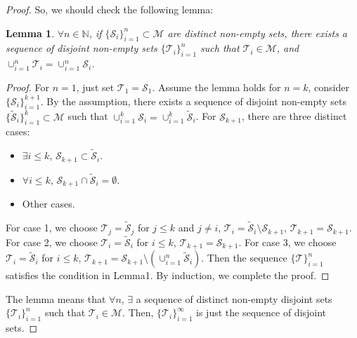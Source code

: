 \documentclass{article}
\newtheorem{lemma}{Lemma}
\begin{document}
\begin{proof}
    So, we should check the following lemma:
    \begin{lemma}
        $\forall n\in\mathbb{N}$, 
        if $\{\mathcal{S}_{i}\}_{i=1}^{n}\subset\mathcal{M}$ 
        are distinct non-empty sets,
        there exists a sequence of disjoint non-empty sets 
        $\{\mathcal{T}_{i}\}_{i=1}^{n}$ 
        such that $\mathcal{T}_{i}\in\mathcal{M}$, and 
        $\cup_{i=1}^{n}\mathcal{T}_{i}=\cup_{i=1}^{n}\mathcal{S}_{i}$.
    \end{lemma}
    \begin{proof}
        For $n=1$, 
        just set $\mathcal{T}_{1}=\mathcal{S}_{1}$.
        Assume the lemma holds for $n=k$, 
        consider $\{\mathcal{S}_{i}\}_{i=1}^{k+1}$. 
        By the assumption, 
        there exists a sequence of disjoint non-empty sets 
        $\{\tilde{\mathcal{S}}_{i}\}_{i=1}^{k}\subset\mathcal{M}$ 
        such that $\cup_{i=1}^{k}\mathcal{S}_{i}
        =\cup_{i=1}^{k}\tilde{\mathcal{S}}_{i}$. 
        For $\mathcal{S}_{k+1}$, there are three distinct cases:
        \begin{itemize}
            \item $\exists i\le k$, 
            $\mathcal{S}_{k+1}\subset\tilde{\mathcal{S}}_{i}$.
            \item $\forall i\le k$, 
            $\mathcal{S}_{k+1}\cap\tilde{\mathcal{S}}_{i}=\emptyset$.
            \item Other cases.
        \end{itemize}
        For case 1, we choose 
        $\mathcal{T}_{j}=\tilde{\mathcal{S}}_{j}$ 
        for $j\le k$ and $j\neq i$, 
        $\mathcal{T}_{i}=\tilde{\mathcal{S}}_{i}
        \setminus\mathcal{S}_{k+1}$, 
        $\mathcal{T}_{k+1}=\mathcal{S}_{k+1}$. 
        For case 2, we choose 
        $\mathcal{T}_{i}=\tilde{\mathcal{S}}_{i}$ for $i\le k$, 
        $\mathcal{T}_{k+1}=\mathcal{S}_{k+1}$. 
        For case 3, we choose 
        $\mathcal{T}_{i}=\tilde{\mathcal{S}}_{i}$ for $i\le k$, 
        $\mathcal{T}_{k+1}=\mathcal{S}_{k+1}\setminus
        \left(\cup_{i=1}^{n}\tilde{\mathcal{S}}_{i}\right)$.
        Then the sequence $\{\mathcal{T}\}_{i=1}^{n}$ 
        satisfies the condition in Lemma1. 
        By induction, we complete the proof.\qedhere
    \end{proof}
    The lemma means that $\forall n$, 
    $\exists$ a sequence of distinct non-empty disjoint sets 
    $\{\mathcal{T}_{i}\}_{i=1}^{n}$ 
    such that $\mathcal{T}_{i}\in\mathcal{M}$. 
    Then, $\{\mathcal{T}_{i}\}_{i=1}^{\infty}$ is just 
    the sequence of disjoint sets.


\end{proof}
\end{document}
